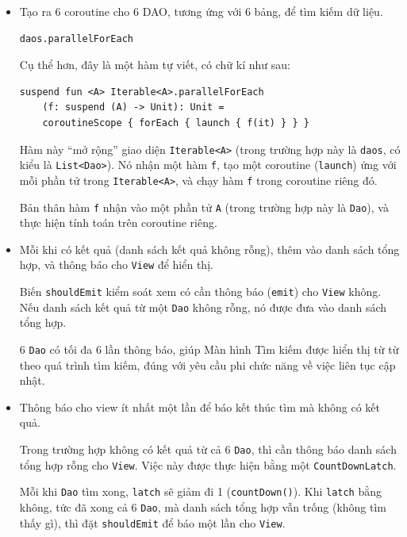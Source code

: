 \documentclass[../../thesis]{subfiles}
\begin{document}
\begin{itemize}
    \item
        Tạo ra 6 coroutine cho 6 DAO, tương ứng với 6 bảng, để tìm kiếm dữ liệu.

        \begin{verbatim}
daos.parallelForEach
        \end{verbatim}

        Cụ thể hơn, đây là một hàm tự viết, có chữ kí như sau:

        \begin{verbatim}
suspend fun <A> Iterable<A>.parallelForEach
    (f: suspend (A) -> Unit): Unit =
    coroutineScope { forEach { launch { f(it) } } }
        \end{verbatim}

        Hàm này ``mở rộng'' giao diện \texttt{Iterable<A>} (trong trường hợp này
        là \texttt{daos}, có kiểu là \texttt{List<Dao>}). Nó nhận một hàm
        \texttt{f}, tạo một coroutine (\texttt{launch}) ứng với mỗi phần tử
        trong \texttt{Iterable<A>}, và chạy hàm \texttt{f} trong coroutine riêng
        đó.

        Bản thân hàm \texttt{f} nhận vào một phần tử \texttt{A} (trong trường
        hợp này là \texttt{Dao}), và thực hiện tính toán trên coroutine riêng.
    \item
        Mỗi khi có kết quả (danh sách kết quả không rỗng), thêm vào danh sách
        tổng hợp, và thông báo cho \texttt{View} để hiển thị.

        Biến \texttt{shouldEmit} kiểm soát xem có cần thông báo (\texttt{emit})
        cho \texttt{View} không. Nếu danh sách kết quả từ một \texttt{Dao} không
        rỗng, nó được đưa vào danh sách tổng hợp.

        6 \texttt{Dao} có tối đa 6 lần thông báo, giúp Màn hình Tìm kiếm được
        hiển thị từ từ theo quá trình tìm kiếm, đúng với yêu cầu phi chức năng
        về việc liên tục cập nhật.
    \item
        Thông báo cho view ít nhất một lần để báo kết thúc tìm mà không có kết
        quả.

        Trong trường hợp không có kết quả từ cả 6 \texttt{Dao}, thì cần thông
        báo danh sách tổng hợp rỗng cho \texttt{View}. Việc này được thực hiện
        bằng một \texttt{CountDownLatch}.

        Mỗi khi \texttt{Dao} tìm xong, \texttt{latch} sẽ giảm đi 1
        (\texttt{countDown()}). Khi \texttt{latch} bằng không, tức đã xong cả 6
        \texttt{Dao}, mà danh sách tổng hợp vẫn trống (không tìm thấy gì), thì
        đặt \texttt{shouldEmit} để báo một lần cho \texttt{View}.


\end{itemize}
\end{document}
